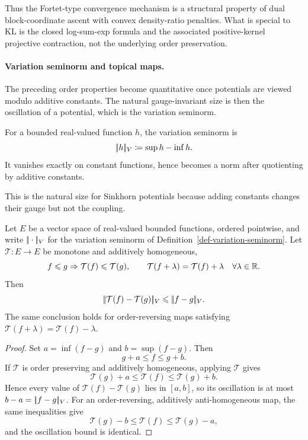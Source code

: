 Thus the Fortet-type convergence mechanism is a structural property of dual block-coordinate ascent with convex density-ratio penalties. What is special to KL is the closed log-sum-exp formula and the associated positive-kernel projective contraction, not the underlying order preservation.

\paragraph{Variation seminorm and topical maps.}
The preceding order properties become quantitative once potentials are viewed modulo additive constants. The natural gauge-invariant size is then the oscillation of a potential, which is the variation seminorm.

\begin{defn}\label{def-variation-seminorm}
	For a bounded real-valued function $h$, the variation seminorm is
	\[
		|\!| h |\!|_V\coloneqq \sup h-\inf h .
	\]
	It vanishes exactly on constant functions, hence becomes a norm after quotienting by additive constants.
\end{defn}
This is the natural size for Sinkhorn potentials because adding constants changes their gauge but not the coupling.

\begin{prop}\label{prop-topical-variation-nonexpansive}
	Let $E$ be a vector space of real-valued bounded functions, ordered pointwise, and write
	$|\!| \cdot |\!|_V$ for the variation seminorm of Definition~\ref{def-variation-seminorm}.
	Let $\mathcal T:E\to E$ be monotone and additively homogeneous,
	\[
		f\leqslant g \Rightarrow \mathcal T(f)\leqslant \mathcal T(g),
		\qquad
		\mathcal T(f+\lambda)=\mathcal T(f)+\lambda
		\quad \forall \lambda\in\mathbb{R} .
	\]
	Then
	\[
		|\!| \mathcal T(f)-\mathcal T(g) |\!|_V
		\leqslant
		|\!| f-g |\!|_V .
	\]
	The same conclusion holds for order-reversing maps satisfying $\mathcal T(f+\lambda)=\mathcal T(f)-\lambda$.
\end{prop}

\begin{proof}
	Set $a=\inf(f-g)$ and $b=\sup(f-g)$. Then
	\[
		g+a\leq f\leq g+b .
	\]
	If $\mathcal T$ is order preserving and additively homogeneous, applying $\mathcal T$ gives
	\[
		\mathcal T(g)+a\leq \mathcal T(f)\leq \mathcal T(g)+b .
	\]
	Hence every value of $\mathcal T(f)-\mathcal T(g)$ lies in $[a,b]$, so its oscillation is at most $b-a=|\!| f-g |\!|_V$. For an order-reversing, additively anti-homogeneous map, the same inequalities give
	\[
		\mathcal T(g)-b\leq \mathcal T(f)\leq \mathcal T(g)-a,
	\]
	and the oscillation bound is identical.
\end{proof}

